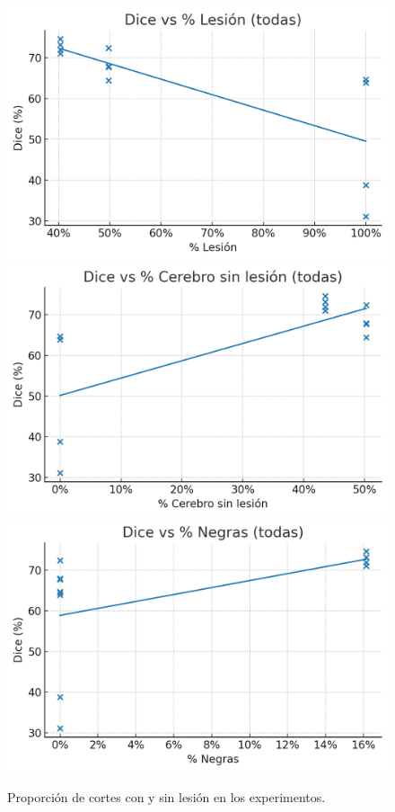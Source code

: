 \documentclass[../main.tex]{subfiles}
\begin{document}
\begin{figure}[!htb]
    \includegraphics[width=\linewidth]{imgs/resultados/corr/dice_vs_lesion.png}
\endminipage\hfill
{}
    \includegraphics[width=\linewidth]{imgs/resultados/corr/dice_vs_sin_lesion.png}
\endminipage\hfill
{}%
    \includegraphics[width=\linewidth]{imgs/resultados/corr/dice_vs_negras.png}
\endminipage
\caption{Proporción de cortes con y sin lesión en los experimentos.}
\label{fig:proporcion_cortes}
\end{figure}
\end{document}
